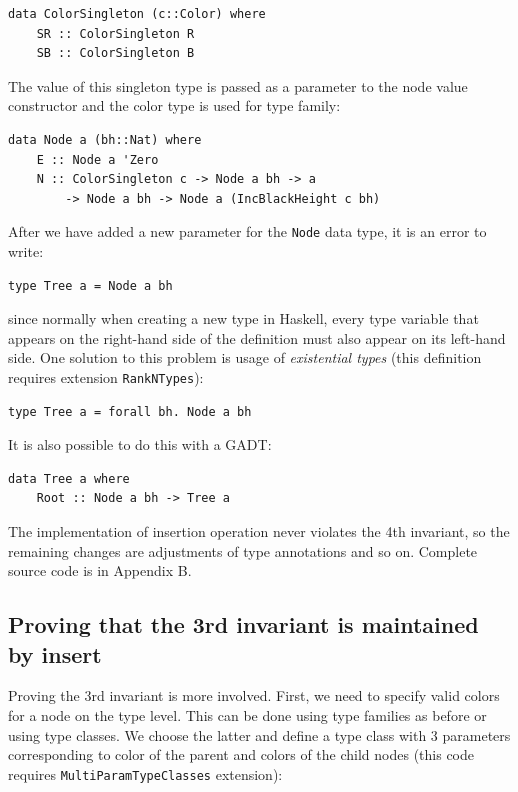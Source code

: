 \documentclass{tmr}
\newcommand{\italic}[1]{\textit{#1}}
\begin{document}
\begin{Verbatim}
data ColorSingleton (c::Color) where
    SR :: ColorSingleton R
    SB :: ColorSingleton B
\end{Verbatim}

The value of this singleton type is passed as a parameter to the node value constructor and the color type is used for type family:

\begin{Verbatim}
data Node a (bh::Nat) where
    E :: Node a 'Zero
    N :: ColorSingleton c -> Node a bh -> a
        -> Node a bh -> Node a (IncBlackHeight c bh)
\end{Verbatim}

After we have added a new parameter for the \verb|Node| data type, it is an error to write:

\begin{Verbatim}
type Tree a = Node a bh
\end{Verbatim}

since normally when creating a new type in Haskell, every type variable that appears on the right-hand side of the definition must also appear on its left-hand side. One solution to this problem is usage of \italic{existential types} (this definition requires extension \verb|RankNTypes|):

\begin{Verbatim}
type Tree a = forall bh. Node a bh
\end{Verbatim}

It is also possible to do this with a GADT:

\begin{Verbatim}
data Tree a where
    Root :: Node a bh -> Tree a
\end{Verbatim}

The implementation of insertion operation never violates the 4th invariant, so the remaining changes are adjustments of type annotations and so on. Complete source code is in Appendix B.

\subsection{Proving that the 3rd invariant is maintained by insert}

Proving the 3rd invariant is more involved. First, we need to specify valid colors for a node on the type level. This can be done using type families as before or using type classes. We choose the latter and define a type class with 3 parameters corresponding to color of the parent and colors of the child nodes (this code requires \verb|MultiParamTypeClasses| extension):
\end{document}
